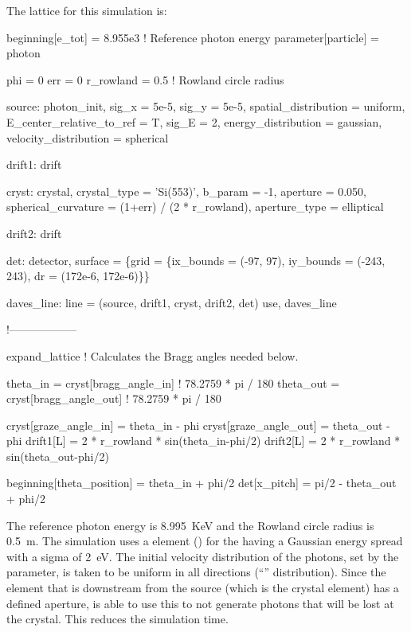 The lattice for this simulation is:
\begin{example}
  beginning[e_tot] = 8.955e3    ! Reference photon energy
  parameter[particle] = photon

  phi = 0
  err = 0
  r_rowland = 0.5               ! Rowland circle radius

  source: photon_init, sig_x = 5e-5, sig_y = 5e-5, spatial_distribution = uniform,
          E_center_relative_to_ref = T, sig_E = 2, energy_distribution = gaussian,
          velocity_distribution = spherical

  drift1: drift

  cryst: crystal, crystal_type = 'Si(553)', b_param = -1, aperture = 0.050,
  	spherical_curvature = (1+err) / (2 * r_rowland), aperture_type = elliptical

  drift2: drift

  det: detector, surface = \{grid = \{ix_bounds = (-97, 97), 
                                    iy_bounds = (-243, 243), dr = (172e-6, 172e-6)\}\}

  daves_line: line = (source, drift1, cryst, drift2, det)
  use, daves_line

  !------------------

  expand_lattice ! Calculates the Bragg angles needed below.

  theta_in  = cryst[bragg_angle_in]  ! 78.2759 * pi / 180
  theta_out = cryst[bragg_angle_out] ! 78.2759 * pi / 180

  cryst[graze_angle_in]  = theta_in - phi
  cryst[graze_angle_out] = theta_out - phi
  drift1[L] = 2 * r_rowland * sin(theta_in-phi/2)
  drift2[L] = 2 * r_rowland * sin(theta_out-phi/2)

  beginning[theta_position] = theta_in + phi/2
  det[x_pitch] = pi/2 - theta_out + phi/2
\end{example}

The reference photon energy is 8.995~KeV and the Rowland circle radius is 0.5~m. The simulation uses
a  element () for the  having a Gaussian energy
spread with a sigma of 2~eV.  The initial velocity distribution of the photons, set by the
 parameter, is taken to be uniform in all directions (``''
distribution). Since the element that is downstream from the source (which is the crystal element)
has a defined aperture, \bmad is able to use this to not generate photons that will be lost at the
crystal. This reduces the simulation time.

